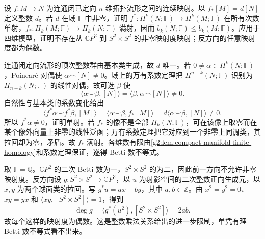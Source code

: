 \begin{exercise}\label{g2:ex:degree-and-duality-injection}
	设 \(f:M\to N\) 为连通闭已定向 \(n\) 维拓扑流形之间的连续映射。以 \(f_*[M]=d[N]\) 定义整数 \(d\)。若 \(d\) 在域 \(\mathbb F\) 中非零，证明 \(f^*:H^k(N;\mathbb F)\to H^k(M;\mathbb F)\) 在所有次数单射，\(f_*:H_k(M;\mathbb F)\to H_k(N;\mathbb F)\) 满射，因而 \(b_k(N;\mathbb F)\leq b_k(M;\mathbb F)\)。应用于四维模型，证明不存在从 \(\mathbb CP^2\) 到 \(S^2\times S^2\) 的非零映射度映射；反方向的任意映射度都为偶数。
\end{exercise}
\begin{solution}
	连通闭定向流形的顶次整数群由基本类生成，故 \(d\) 唯一。若 \(0\ne\alpha\in H^k(N;\mathbb F)\)，Poincaré 对偶使 \(\alpha\frown[N]\ne0\)。域上的万有系数定理把 \(H^{n-k}(N;\mathbb F)\) 识别为 \(H_{n-k}(N;\mathbb F)\) 的线性对偶，故可选 \(\beta\) 使
	\[
		\langle\alpha\smile\beta,[N]\rangle
		=\langle\beta,\alpha\frown[N]\rangle\ne0.
	\]
	自然性与基本类的系数变化给出
	\[
		\langle f^*\alpha\smile f^*\beta,[M]\rangle
		=\langle\alpha\smile\beta,f_*[M]\rangle
		=d\langle\alpha\smile\beta,[N]\rangle\ne0.
	\]
	所以 \(f^*\alpha\ne0\)，证明单射。若 \(f_*\) 的像不是全部 \(H_k(N;\mathbb F)\)，可在该像上取零而在某个像外向量上非零的线性泛函；万有系数定理把它对应到一个非零上同调类，其拉回却为零，矛盾。故 \(f_*\) 满射。各维数有限由\cref{g2:lem:compact-manifold-finite-homology}和系数定理保证，遂得 Betti 数不等式。

	取 \(\mathbb F=\mathbb Q\)。\(\mathbb CP^2\) 的二次 Betti 数为一，\(S^2\times S^2\) 的为二，因此前一方向不允许非零映射度。反方向设 \(g:S^2\times S^2\to\mathbb CP^2\)，以 \(u\) 为射影空间的二次整数正向生成元，以 \(x,y\) 为两个球面类的拉回。写 \(g^*u=ax+by\)，其中 \(a,b\in\mathbb Z\)。由 \(x^2=y^2=0\)、\(xy=yx\) 和 \(\langle xy,[S^2\times S^2]\rangle=1\)，得到
	\[
		\deg g=\langle g^*(u^2),[S^2\times S^2]\rangle=2ab.
	\]
	故每个这样的映射度为偶数。这是整数乘法关系给出的进一步限制，单凭有理 Betti 数不等式看不出来。
\end{solution}

